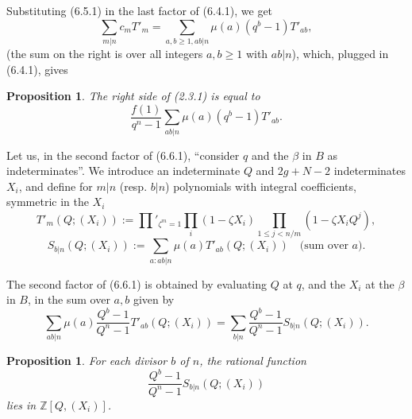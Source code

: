 \documentclass[11pt,a4paper]{article}
\theoremstyle{plain}
\newtheorem{proposition}[theorem]{Proposition}
\theoremstyle{definition}
\newcommand{\Z}{\mathbb{Z}}
\begin{document}
Substituting (6.5.1) in the last factor of (6.4.1), we get
\begin{equation}
\sum_{m | n} c_m T'_m = \sum_{a,b \geq 1, ab | n} \mu(a) (q^b - 1) T'_{ab}, \tag{6.5.2}
\end{equation}
(the sum on the right is over all integers $a,b \geq 1$ with $ab | n$), which, plugged in (6.4.1), gives

\begin{proposition}
The right side of (2.3.1) is equal to
\begin{equation}
\frac{f(1)}{q^n - 1} \sum_{ab | n} \mu(a) (q^b - 1) T'_{ab}. \tag{6.6.1}
\end{equation}
\end{proposition}

Let us, in the second factor of (6.6.1), ``consider $q$ and the $\beta$ in $B$ as indeterminates''. We introduce an indeterminate $Q$ and $2g + N - 2$ indeterminates $X_i$, and define for $m | n$ (resp. $b | n$) polynomials with integral coefficients, symmetric in the $X_i$
\begin{equation}
T'_m(Q; (X_i)) := \prod'_{\zeta^m=1} \prod_i (1 - \zeta X_i) \prod_{1 \leq j < n/m} (1 - \zeta X_i Q^j), \tag{6.6.2}
\end{equation}
\begin{equation}
S_{b|n}(Q; (X_i)) := \sum_{a: ab | n} \mu(a) T'_{ab}(Q; (X_i)) \quad \text{(sum over $a$)}. \tag{6.6.3}
\end{equation}

The second factor of (6.6.1) is obtained by evaluating $Q$ at $q$, and the $X_i$ at the $\beta$ in $B$, in the sum over $a,b$ given by
\begin{equation}
\sum_{ab | n} \mu(a) \frac{Q^b - 1}{Q^n - 1} T'_{ab}(Q; (X_i)) = \sum_{b | n} \frac{Q^b - 1}{Q^n - 1} S_{b|n}(Q; (X_i)). \tag{6.6.4}
\end{equation}

\begin{proposition}
For each divisor $b$ of $n$, the rational function
\[
\frac{Q^b - 1}{Q^n - 1} S_{b|n}(Q; (X_i))
\]
lies in $\Z[Q, (X_i)]$.
\end{proposition}
\end{document}
